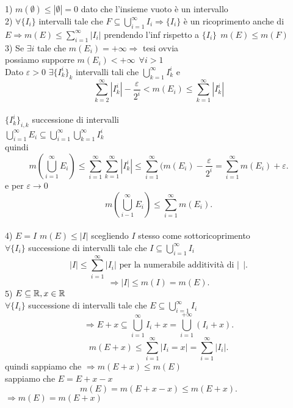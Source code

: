\documentclass{article}
\begin{document}
	\begin{dimo}
		1) $m(\emptyset)\leq |\emptyset| = 0$ dato che l'insieme vuoto è un intervallo\\
		2)  $\forall\{I_i\}$ intervalli tale che  $F\subseteq \bigcup^{\infty}_{i=1} I_i \Rightarrow \{I_i\}$   è un ricoprimento anche di $E \Rightarrow m(E) \leq \sum^{\infty}_{i=1}|I_i|$ prendendo l'inf rispetto a $\{I_i\}\ \ m(E)\leq m(F)$\\
		3) Se $\exists i$ tale che $m(E_i) = +\infty \Rightarrow $  tesi ovvia\\
		possiamo supporre $m(E_i) < +\infty \ \ \forall i > 1$\\
		Dato  $\varepsilon > 0$  $\exists \{I^i_k\}_k$ intervalli tali che  $\bigcup^{\infty}_{k=1}I_k^i$ e \[ \sum^{\infty}_{k=2}|I_k^i| - \frac \varepsilon {2^i} < m(E_i)\leq \sum^{\infty}_{k=1}|I_k^i|\]\\
		$\{I_k^i\}_{i,k}$ successione di intervalli\\
		 $\displaystyle \bigcup^{\infty}_{i=1}E_i\subseteq \bigcup^{\infty}_{i=1}\bigcup^{\infty}_{k=1}I_k^i$ \\
		 quindi 
		 \[
		 m( \bigcup^{\infty}_{i=1}E_i)\leq \sum^{\infty}_{i=1} \sum^{\infty}_{k=1}|I_k^i| \leq \sum^{\infty}_{i = 1}(m(E_i) - \frac{\varepsilon}{2^i} = \sum^{\infty}_{i = 1}m(E_i) + \varepsilon
		 .\] 
		 e per $ \varepsilon \rightarrow 0$
		 \[
		 m( \bigcup^{\infty}_{i-1}E_i)\leq \sum^{\infty}_{i=1}m(E_i)
		 .\] 
		 \newpage \ \\
		 4) $E = I$  $m(E) \leq |I|$ scegliendo  $I$ stesso come sottoricoprimento \\
		 $\forall \{ I_i\}$ successione di intervalli tale che  $I\subseteq \bigcup^{\infty}_{i=1}I_i$\\
		 \[
			 |I|\leq \sum^{\infty}_{i=1}|I_i| \text{ per la numerabile additività di } |\ \ | 
		 .\] 
		 \[
		 \Rightarrow  |I|\leq m(I) = m(E)
		 .\] 
		 5) $E\subseteq \mathbb{R}, x\in\mathbb{R}$\\
		 $\forall \{I_i\}$ successione di intervalli tale che $E\subseteq \bigcup^{\infty}_{i=1}I_i$\\
		 \[
		  \Rightarrow E + x \subseteq \bigcup^{\infty}_{i=1}I_i + x = \bigcup^{+\infty}_{i=1}(I_i + x)
		 .\] 
		 \[
		 m(E+ x) \leq \sum^{\infty}_{i= 1}|I_i = x| = \sum^{\infty}_{i=1}|I_i|
		 .\] 
		 quindi sappiamo che $ \Rightarrow m(E + x) \leq m(E)$\\
		 sappiamo che $E = E+x - x$\\
		  \[
		  m(E) = m(E + x -x )\leq m(E + x)
		  .\] 
		  $ \Rightarrow m(E) = m(E + x)$ \\


	\end{dimo}
\end{document}
